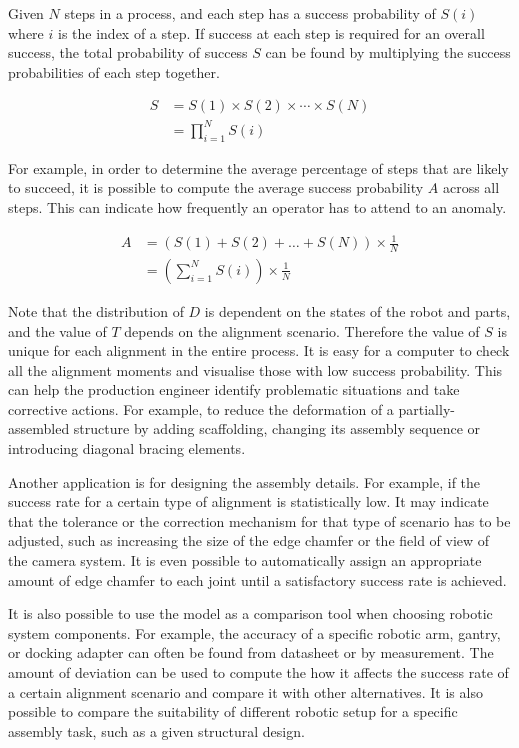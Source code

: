 Given $N$ steps in a process, and each step has a success probability of $S(i)$ where $i$ is the index of a step. If success at each step is required for an overall success, the total probability of success $S$ can be found by multiplying the success probabilities of each step together.

\begin{align} \label{eq:total-probability-success}
    S &= S(1) \times S(2) \times \cdots \times S(N)\nonumber \\
      &= \prod_{i=1}^{N} S(i)
\end{align}

For example, in order to determine the average percentage of steps that are likely to succeed, it is possible to compute the average success probability $A$ across all steps. This can indicate how frequently an operator has to attend to an anomaly.

\begin{align} \label{eq:average-step-success-probability}
    A &= (S(1) + S(2) + \ldots + S(N)) \times \frac{1}{N}\nonumber \\
      &= \left(\sum_{i=1}^{N} S(i)\right) \times \frac{1}{N}
\end{align}

Note that the distribution of $D$ is dependent on the states of the robot and parts, and the value of $T$ depends on the alignment scenario. Therefore the value of $S$ is unique for each alignment in the entire process. It is easy for a computer to check all the alignment moments and visualise those with low success probability. This can help the production engineer identify problematic situations and take corrective actions. For example, to reduce the deformation of a partially-assembled structure by adding scaffolding, changing its assembly sequence or introducing diagonal bracing elements.

Another application is for designing the assembly details. For example, if the success rate for a certain type of alignment is statistically low. It may indicate that the tolerance or the correction mechanism for that type of scenario has to be adjusted, such as increasing the size of the edge chamfer or the field of view of the camera system. It is even possible to automatically assign an appropriate amount of edge chamfer to each joint until a satisfactory success rate is achieved.

It is also possible to use the model as a comparison tool when choosing robotic system components. For example, the accuracy of a specific robotic arm, gantry, or docking adapter can often be found from datasheet or by measurement. The amount of deviation can be used to compute the how it affects the success rate of a certain alignment scenario and compare it with other alternatives. It is also possible to compare the suitability of different robotic setup for a specific assembly task, such as a given structural design.


